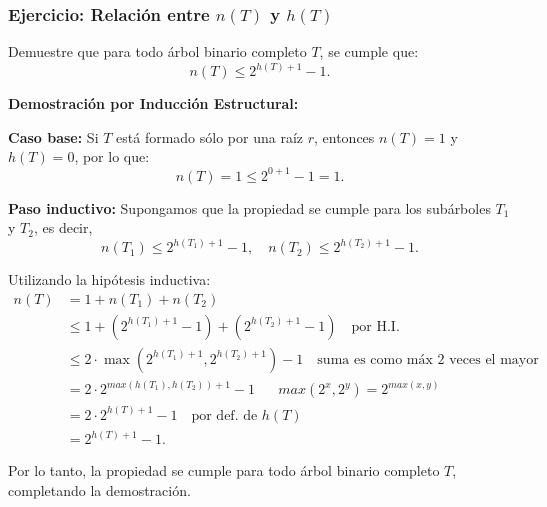 \subsubsection{Ejercicio: Relación entre $n(T)$ y $h(T)$}
Demuestre que para todo árbol binario completo $T$, se cumple que:
\[
    n(T) \leq 2^{h(T)+1} - 1.
\]

\textbf{Demostración por Inducción Estructural:}

\textbf{Caso base:} Si $T$ está formado sólo por una raíz $r$, entonces $n(T) = 1$ y $h(T) = 0$, por lo que:
\[
    n(T) = 1 \leq 2^{0+1} - 1 = 1.
\]

\textbf{Paso inductivo:} Supongamos que la propiedad se cumple para los subárboles $T_1$ y $T_2$, es decir,
\[
    n(T_1) \leq 2^{h(T_1)+1} - 1, \quad n(T_2) \leq 2^{h(T_2)+1} - 1.
\]


Utilizando la hipótesis inductiva:
\begin{align*}
n(T) &= 1 + n(T_1) + n(T_2) \quad  \\
&\leq 1 + (2^{h(T_1)+1 }- 1) + (2^{h(T_2)+1} - 1) \quad \text{por H.I.} \\
&\leq 2 \cdot \max(2^{h(T_1)+1} , 2^{h(T_2)+1}) - 1 \quad \text{suma es como máx 2 veces el mayor} \\
&= 2 \cdot 2^{max(h(T_1),h(T_2))+1} - 1 \quad \text{ } max(2^x,2^y) = 2^{max(x,y)} \\
&= 2 \cdot 2^{h(T)+1} - 1 \quad \text{por def. de } h(T) \\
&= 2^{h(T)+1} - 1.
\end{align*}


Por lo tanto, la propiedad se cumple para todo árbol binario completo $T$, completando la demostración.




